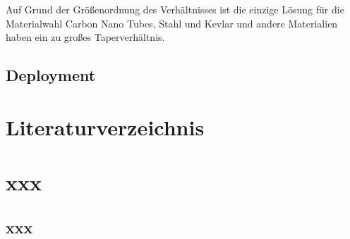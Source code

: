 \documentclass[a4paper, 10pt]{report}
\begin{document}
Auf Grund der Größenordnung des Verhältnisses ist die einzige Lösung für die Materialwahl Carbon Nano Tubes, Stahl und Kevlar und andere Materialien haben ein zu großes Taperverhältnis.



\section{Deployment}



\chapter*{Literaturverzeichnis}

\appendix
\chapter{xxx}
\section{xxx}
\end{document}

